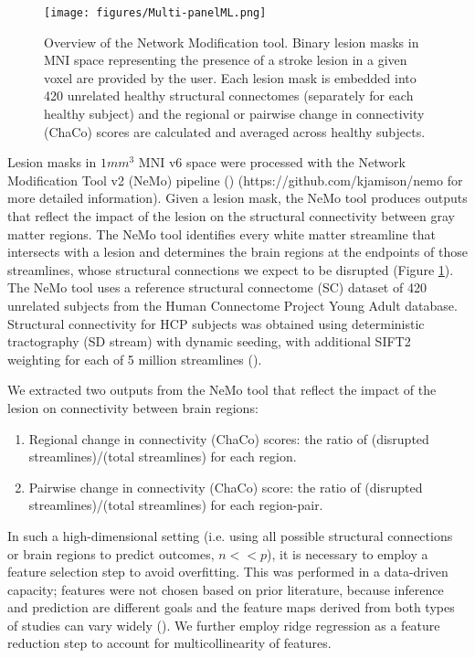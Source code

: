 \documentclass[10pt]{article}
\begin{document}
\begin{figure}[htp]
\centering
\texttt{[image: figures/Multi-panelML.png]}
\caption{Overview of the Network Modification tool. Binary lesion masks in MNI space representing the presence of a stroke lesion in a given voxel are provided by the user. Each lesion mask is embedded into 420 unrelated healthy structural connectomes (separately for each healthy subject) and the regional or pairwise change in connectivity (ChaCo) scores are calculated and averaged across healthy subjects. }
\label{nemotool}
\end{figure}
Lesion masks in $1mm^3$ MNI v6 space were processed with the Network Modification Tool v2 (NeMo) pipeline (\cite{Kuceyeski2013-nk}) (https://github.com/kjamison/nemo for more detailed information). Given a lesion mask, the NeMo tool produces outputs that reflect the impact of the lesion on the structural connectivity between gray matter regions. The NeMo tool identifies every white matter streamline that intersects with a lesion and determines the brain regions at the endpoints of those streamlines, whose structural connections we expect to be disrupted (Figure \ref{nemotool}). The NeMo tool uses a reference structural connectome (SC) dataset of 420 unrelated subjects from the Human Connectome Project Young Adult database. Structural connectivity for HCP subjects was obtained using deterministic tractography (SD stream) with dynamic seeding, with additional SIFT2 weighting for each of 5 million streamlines (\cite{Smith2015-eb}).


We extracted two outputs from the NeMo tool that reflect the impact of the lesion on connectivity between brain regions:

\begin{enumerate}
\item Regional change in connectivity (ChaCo) scores: the ratio of (disrupted streamlines)/(total streamlines) for each region.
\item Pairwise change in connectivity (ChaCo) score: the ratio of (disrupted streamlines)/(total streamlines) for each region-pair.
\end{enumerate}

In such a high-dimensional setting (i.e. using all possible structural connections or brain regions to predict outcomes, $n<<p$), it is necessary to employ a feature selection step to avoid overfitting. This was performed in a data-driven capacity; features were not chosen based on prior literature, because inference and prediction are different goals and the feature maps derived from both types of studies can vary widely (\cite{Sperber2021-lw, Bzdok2020-py}). We further employ ridge regression as a feature reduction step to account for multicollinearity of features. 
\end{document}
